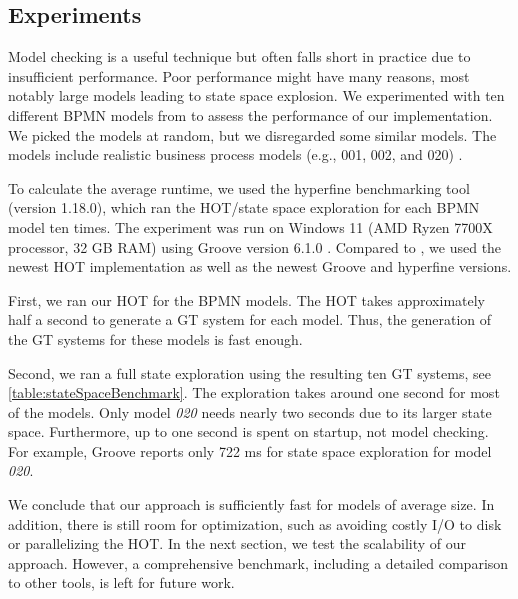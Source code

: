 \documentclass{lmcs} %
\begin{document}
\subsection{Experiments}

Model checking is a useful technique but often falls short in practice due to insufficient performance.
Poor performance might have many reasons, most notably large models leading to state space explosion.
We experimented with ten different BPMN models from \cite{houhouFirstOrderLogicVerification2022} to assess the performance of our implementation.
We picked the models at random, but we disregarded some similar models.
The models include realistic business process models (e.g., 001, 002, and 020) \cite{houhouFirstOrderLogicVerification2022}.

To calculate the average runtime, we used the hyperfine benchmarking tool \cite{peterHyperfine2023} (version 1.18.0), which ran the HOT/state space exploration for each BPMN model ten times.
The experiment was run on Windows 11 (AMD Ryzen 7700X processor, 32 GB RAM) using Groove version 6.1.0 \cite{timkrauterLMCS2024Artifacts2023}.
Compared to \cite{krauterFormalizationAnalysisBPMN2023}, we used the newest HOT implementation as well as the newest Groove and hyperfine versions.

First, we ran our HOT for the BPMN models.
The HOT takes approximately half a second to generate a GT system for each model.
Thus, the generation of the GT systems for these models is fast enough.

Second, we ran a full state exploration using the resulting ten GT systems, see \autoref{table:stateSpaceBenchmark}.
The exploration takes around one second for most of the models.
Only model \textit{020} needs nearly two seconds due to its larger state space.
Furthermore, up to one second is spent on startup, not model checking.
For example, Groove reports only 722 ms for state space exploration for model \textit{020}.

We conclude that our approach is sufficiently fast for models of average size.
In addition, there is still room for optimization, such as avoiding costly I/O to disk or parallelizing the HOT.
In the next section, we test the scalability of our approach.
However, a comprehensive benchmark, including a detailed comparison to other tools, is left for future work.
\end{document}
